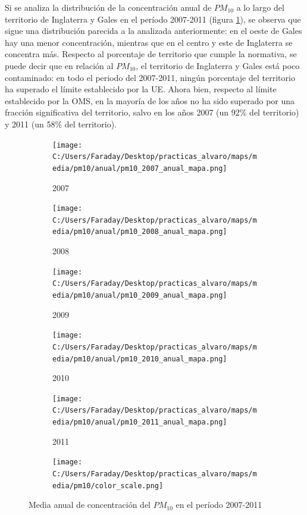 \documentclass[12pt]{article}
\begin{document}
Si se analiza la distribución de la concentración anual de $PM_{10}$ a lo largo del territorio de Inglaterra y Gales en el período 2007-2011 (figura \ref{fig:map-pm10-anual}), se observa que sigue una distribución parecida a la analizada anteriormente: en el oeste de Gales hay una menor concentración, mientras que en el centro y este de Inglaterra se concentra más. Respecto al porcentaje de territorio que cumple la normativa, se puede decir que en relación al $PM_{10}$, el territorio de Inglaterra y Gales está poco contaminado: en todo el periodo del 2007-2011, ningún porcentaje del territorio ha superado el límite establecido por la UE. Ahora bien, respecto al límite establecido por la OMS, en la mayoría de los años no ha sido superado por una fracción significativa del territorio, salvo en los años 2007 (un 92\% del territorio) y 2011 (un 58\% del territorio).

\begin{figure}[H]
\centering
\begin{subfigure}[H]{0.18\textwidth}
\texttt{[image: C:/Users/Faraday/Desktop/practicas\_alvaro/maps/media/pm10/anual/pm10\_2007\_anual\_mapa.png]}
\captionsetup{labelformat=empty}
\caption{2007}
\end{subfigure}
%
\begin{subfigure}[H]{0.18\textwidth}
\texttt{[image: C:/Users/Faraday/Desktop/practicas\_alvaro/maps/media/pm10/anual/pm10\_2008\_anual\_mapa.png]}
\captionsetup{labelformat=empty}
\caption{2008}
\end{subfigure}
%
\begin{subfigure}[H]{0.18\textwidth}
\texttt{[image: C:/Users/Faraday/Desktop/practicas\_alvaro/maps/media/pm10/anual/pm10\_2009\_anual\_mapa.png]}
\captionsetup{labelformat=empty}
\caption{2009}
\end{subfigure}
%
\begin{subfigure}[H]{0.18\textwidth}
\texttt{[image: C:/Users/Faraday/Desktop/practicas\_alvaro/maps/media/pm10/anual/pm10\_2010\_anual\_mapa.png]}
\captionsetup{labelformat=empty}
\caption{2010}
\end{subfigure}
%
\begin{subfigure}[H]{0.18\textwidth}
\texttt{[image: C:/Users/Faraday/Desktop/practicas\_alvaro/maps/media/pm10/anual/pm10\_2011\_anual\_mapa.png]}
\captionsetup{labelformat=empty}
\caption{2011}
\end{subfigure}

\begin{subfigure}[H]{0.45\textwidth}
\texttt{[image: C:/Users/Faraday/Desktop/practicas\_alvaro/maps/media/pm10/color\_scale.png]}
\captionsetup{labelformat=empty}
\caption{}
\end{subfigure}

\vspace*{-7mm}
\caption{Media anual de concentración del $PM_{10}$ en el período 2007-2011}
\label{fig:map-pm10-anual}
\end{figure}
\end{document}
